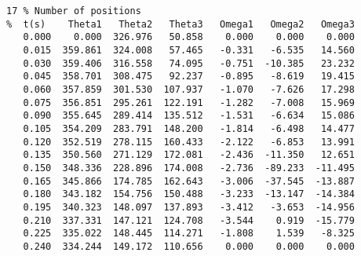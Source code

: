 \begin{verbatim}
17 % Number of positions
%  t(s)    Theta1   Theta2   Theta3   Omega1   Omega2   Omega3
   0.000    0.000  326.976   50.858    0.000    0.000    0.000
   0.015  359.861  324.008   57.465   -0.331   -6.535   14.560
   0.030  359.406  316.558   74.095   -0.751  -10.385   23.232
   0.045  358.701  308.475   92.237   -0.895   -8.619   19.415
   0.060  357.859  301.530  107.937   -1.070   -7.626   17.298
   0.075  356.851  295.261  122.191   -1.282   -7.008   15.969
   0.090  355.645  289.414  135.512   -1.531   -6.634   15.086
   0.105  354.209  283.791  148.200   -1.814   -6.498   14.477
   0.120  352.519  278.115  160.433   -2.122   -6.853   13.991
   0.135  350.560  271.129  172.081   -2.436  -11.350   12.651
   0.150  348.336  228.896  174.008   -2.736  -89.233  -11.495
   0.165  345.866  174.785  162.643   -3.006  -37.545  -13.887
   0.180  343.182  154.756  150.488   -3.233  -13.147  -14.384
   0.195  340.323  148.097  137.893   -3.412   -3.653  -14.956
   0.210  337.331  147.121  124.708   -3.544    0.919  -15.779
   0.225  335.022  148.445  114.271   -1.808    1.539   -8.325
   0.240  334.244  149.172  110.656    0.000    0.000    0.000
\end{verbatim}
